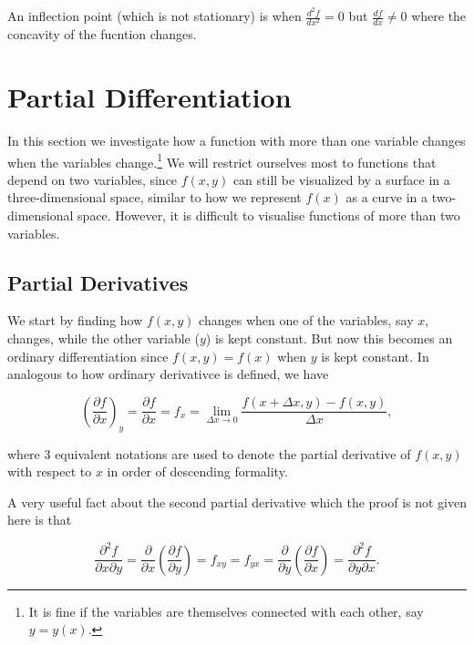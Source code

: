 \documentclass[english,a4paper,12pt]{report}
\begin{document}
An inflection point (which is not stationary) is when \(\displaystyle \frac{d^2f}{dx^2} = 0\) but \(\displaystyle \frac{df}{dx} \neq 0\) where the concavity of the fucntion changes.  

\section{Partial Differentiation}

In this section we investigate how a function with more than one variable changes when the variables change.\footnote{It is fine if the variables are themselves connected with each other, say \(y = y(x)\).} We will restrict ourselves most to functions that depend on two variables, since \(f(x,y)\) can still be visualized by a surface in a three-dimensional space, similar to how we represent \(f(x)\) as a curve in a two-dimensional space. However, it is difficult to visualise functions of more than two variables. 

\subsection{Partial Derivatives}

We start by finding how \(f(x,y)\) changes when one of the variables, say \(x\), changes, while the other variable (\(y\)) is kept constant. But now this becomes an ordinary differentiation since \(f(x,y) = f(x)\) when \(y\) is kept constant. In analogous to how ordinary derivativce is defined, we have

\begin{equation}
    \left( \frac{\partial f}{\partial x} \right)_{y} = \frac{\partial f}{\partial x} = f_{x}  = \lim_{\Delta x \to 0} \frac{f(x+\Delta x,y) - f(x,y)}{\Delta x},
\end{equation}

where 3 equivalent notations are used to denote the partial derivative of \(f(x,y)\) with respect to \(x\) in order of descending formality.

A very useful fact about the second partial derivative which the proof is not given here is that 

\begin{equation}
    \frac{\partial^2 f}{\partial x \partial y} = \frac{\partial }{\partial x} \left( \frac{\partial f}{\partial y}  \right) = f_{xy} = f_{yx} = \frac{\partial }{\partial y} \left( \frac{\partial f}{\partial x}  \right) = \frac{\partial^2 f}{\partial y \partial x}.     
\end{equation}
\end{document}
